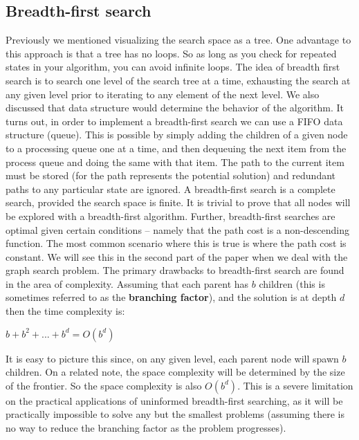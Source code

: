 \documentclass[a4paper,11pt]{report}
\begin{document}
\subsection{Breadth-first search}
Previously we mentioned visualizing the search space as a tree.  One advantage
to this approach is that a tree has no loops.  So as long as you check for
repeated states in your algorithm, you can avoid infinite loops.  The idea of
breadth first search is to search one level of the search tree at a time,
exhausting the search at any given level prior to iterating to any element of
the next level.  We also discussed that data structure would determine the 
behavior of the algorithm.  It turns out, in order to implement a breadth-first
search we can use a FIFO data structure (queue).\cite{norvig} This is possible
by simply adding the children of a given node to a processing queue one at a
time, and then dequeuing the next item from the process queue and doing the
same with that item. The path to the current item must be stored (for the path
represents the potential solution) and redundant paths to any particular state
are ignored.\cite{norvig} A breadth-first search is a complete search, provided
the search space is finite.  It is trivial to prove that all nodes will be
explored with a breadth-first algorithm.  Further, breadth-first searches are
optimal given certain conditions -- namely that the path cost is a
non-descending function.  The most common scenario where this is true is where
the path cost is constant.\cite{norvig}  We will see this in the second part of
the paper when we deal with the graph search problem. The primary drawbacks to
breadth-first search are found in the area of complexity.  Assuming that each
parent has $b$ children (this is sometimes referred to as the 
\textbf{branching factor}), and the solution is at depth $d$ then the 
time complexity is:\vspace{5 mm}

$b + b^2 + ... + b^d = O(b^d)$ \cite{norvig}\vspace{5 mm}

It is easy to picture this since, on any given level, each parent node will
spawn $b$ children.  On a related note, the space complexity will be
determined by the size of the frontier.\cite{norvig} So the space complexity is
also $O(b^d)$.  This is a severe limitation on the
practical applications of uninformed breadth-first searching, as it will be
practically impossible to solve any but the smallest problems (assuming there
is no way to reduce the branching factor as the problem progresses).
\end{document}
